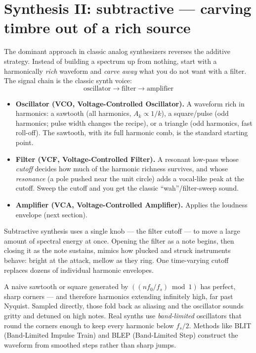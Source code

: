 \section{Synthesis II: subtractive --- carving timbre out of a rich source}
\label{ch28:subtractive}

The dominant approach in classic analog synthesizers reverses the additive
strategy. Instead of building a spectrum up from nothing, start with a
harmonically \emph{rich} waveform and \emph{carve away} what you do not want with
a filter. The signal chain is the classic synth voice:
\[
\boxed{\text{oscillator}} \rightarrow \boxed{\text{filter}} \rightarrow \boxed{\text{amplifier}}
\]
\begin{itemize}
  \item \textbf{Oscillator (VCO, Voltage-Controlled Oscillator).} A waveform rich in harmonics: a sawtooth (all
        harmonics, $A_k\propto 1/k$), a square/pulse (odd harmonics; pulse width
        changes the recipe), or a triangle (odd harmonics, fast roll-off). The
        sawtooth, with its full harmonic comb, is the standard starting point.
  \item \textbf{Filter (VCF, Voltage-Controlled Filter).} A resonant low-pass whose \emph{cutoff} decides
        how much of the harmonic richness survives, and whose \emph{resonance} (a
        pole pushed near the unit circle) adds a vocal-like peak at the cutoff.
        Sweep the cutoff and you get the classic ``wah''/filter-sweep sound.
  \item \textbf{Amplifier (VCA, Voltage-Controlled Amplifier).} Applies the loudness envelope (next section).
\end{itemize}

\begin{happeningbox}
Subtractive synthesis uses a single knob --- the filter cutoff --- to move a large amount of spectral energy at once. Opening the filter as a note begins, then closing it as the note sustains, mimics how plucked and struck instruments behave: bright at the attack, mellow as they ring. One time-varying cutoff replaces dozens of individual harmonic envelopes.
\end{happeningbox}

\begin{trapbox}
A naive sawtooth or square generated by $((n f_0/f_s)\bmod 1)$ has perfect, sharp
corners --- and therefore harmonics extending infinitely high, far past Nyquist.
Sampled directly, those fold back as aliasing and the oscillator sounds gritty
and detuned on high notes. Real synths use \emph{band-limited} oscillators
that round the corners enough to keep every harmonic below $f_s/2$. Methods like BLIT (Band-Limited Impulse Train) and BLEP (Band-Limited Step) construct the waveform from smoothed steps rather than sharp jumps.
\end{trapbox}

